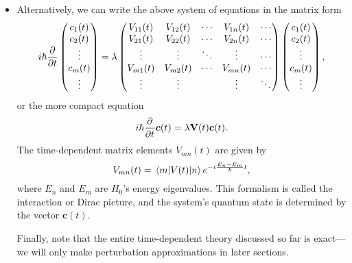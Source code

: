 \documentclass[11pt, a4paper]{article}
\renewcommand{\vec}[1]{\bm{#1}}  %
\newcommand{\mat}[1]{\mathbf{#1}}  %
\begin{document}
\begin{itemize}
    \item Alternatively, we can write the above system of equations in the matrix form
    \begin{equation*}
        i \hbar \pdv{t} 
        \begin{pmatrix}
            c_{1}(t)\\
            c_{2}(t)\\
            \vdots\\
            c_{m}(t)\\
            \vdots
        \end{pmatrix}
        = \lambda
        \begin{pmatrix}
            V_{11}(t) & V_{12}(t) & \cdots & V_{1n}(t) & \cdots \\
            V_{21}(t) & V_{22}(t) & \cdots & V_{2n}(t) & \cdots \\
            \vdots & \vdots & \ddots & \vdots & \cdots \\
            V_{m1}(t) & V_{m2}(t) & \cdots & V_{mn}(t) & \cdots \\
            \vdots & \vdots &  & \vdots & \ddots 
        \end{pmatrix}
        \begin{pmatrix}
            c_{1}(t)\\
            c_{2}(t)\\
            \vdots\\
            c_{m}(t)\\
            \vdots
        \end{pmatrix},
    \end{equation*}
    or the more compact equation
    \begin{equation*}
        i \hbar \pdv{t} \vec{c}(t) = \lambda \mat{V}(t) \vec{c}(t).
    \end{equation*}
    The time-dependent matrix elements $ V_{mn}(t) $ are given by
    \begin{equation*}
        V_{mn}(t) = \mel{m}{V(t)}{n} e^{-i \frac{E_{n} - E_{m}}{\hbar}t},
    \end{equation*}
    where $ E_{n} $ and $ E_{m} $ are $ H_{0} $'s energy eigenvalues. This formalism is called the interaction or Dirac picture, and the system's quantum state is determined by the vector $ \vec{c}(t) $.

    Finally, note that the entire time-dependent theory discussed so far is exact---we will only make perturbation approximations in later sections.
    
\end{itemize}
\end{document}
